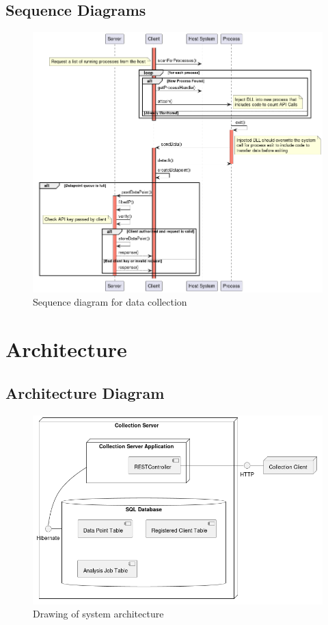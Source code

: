 \documentclass[titlepage]{article}
\begin{document}
\subsection{Sequence Diagrams}

\begin{figure}[H]
\includegraphics[scale=.57]{SequenceDiagrams/monitoringSD.png}
\caption{Sequence diagram for data collection}
\centering
\end{figure}

\section{Architecture}

\subsection{Architecture Diagram}

\begin{figure}[H]
\includegraphics[scale=.57]{Architecture/arch.png}
\caption{Drawing of system architecture}
\centering
\end{figure}
\end{document}
